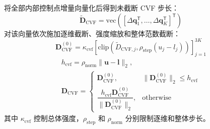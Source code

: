 将全部内部控制点增量向量化后得到未截断 CVF 步长：
\begin{equation}
    \widetilde{\mathbf D}_{\mathrm{CVF}}=
    \mathrm{vec}
    \left(
    [\Delta\mathbf q_1^\mathsf{T},\ldots,\Delta\mathbf q_K^\mathsf{T}]^\mathsf{T}
    \right)
    \label{eq:cvf-vectorization}
\end{equation}
对该向量依次施加逐维截断、强度缩放和整体范数截断：
\begin{equation}
    \mathbf D_{\mathrm{CVF}}^{(0)}
    =
    \kappa_{\mathrm{cvf}}
    \left[
    \mathrm{clip}
    \left(
    \widetilde D_{\mathrm{CVF},j},
    \rho_{\mathrm{step}}(u_j-l_j)
    \right)
    \right]_{j=1}^{3K}
    \label{eq:component-clip}
\end{equation}
\begin{equation}
    \begin{gathered}
    h_{\mathrm{cvf}}=\rho_{\mathrm{norm}}\|\mathbf u-\mathbf l\|_2,\\
    \mathbf D_{\mathrm{CVF}}=
    \begin{cases}
    \mathbf D_{\mathrm{CVF}}^{(0)}, &
    \|\mathbf D_{\mathrm{CVF}}^{(0)}\|_2\leq h_{\mathrm{cvf}}\\
    \dfrac{h_{\mathrm{cvf}}\mathbf D_{\mathrm{CVF}}^{(0)}}
    {\|\mathbf D_{\mathrm{CVF}}^{(0)}\|_2}, &
    \mathrm{otherwise}
    \end{cases}
    \end{gathered}
    \label{eq:norm-clip}
\end{equation}
其中 $\kappa_{\mathrm{cvf}}$ 控制总体强度，$\rho_{\mathrm{step}}$ 和 $\rho_{\mathrm{norm}}$ 分别限制逐维和整体步长。

